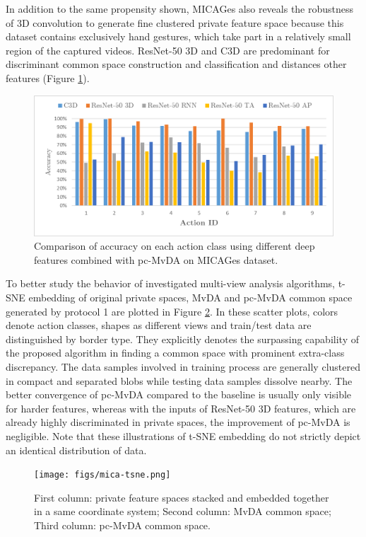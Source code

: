     In addition to the same propensity shown, MICAGes also reveals the robustness of 3D convolution to generate fine clustered private feature space because this dataset contains exclusively hand gestures, which take part in a relatively small region of the captured videos. ResNet-50 3D and C3D are predominant for discriminant common space construction and classification and distances other features (Figure \ref{fig:pc-MvDA_confusion_mica}).

    \begin{figure}[htbp]
        \centering
        \includegraphics[width=0.8\linewidth]{figs/pc-MvDA_confusion_mica.png}
        \caption{Comparison of accuracy on each action class using different deep features combined with pc-MvDA on MICAGes dataset.}
        \label{fig:pc-MvDA_confusion_mica}
    \end{figure}

    To better study the behavior of investigated multi-view analysis algorithms, t-SNE embedding of original private spaces, MvDA and pc-MvDA common space generated by protocol 1 are plotted in Figure \ref{fig:mica-tsne}. In these scatter plots, colors denote action classes, shapes as different views and train/test data are distinguished by border type. They explicitly denotes the surpassing capability of the proposed algorithm in finding a common space with prominent extra-class discrepancy. The data samples involved in training process are generally clustered in compact and separated blobs while testing data samples dissolve nearby. The better convergence of pc-MvDA compared to the baseline is usually only visible for harder features, whereas with the inputs of ResNet-50 3D features, which are already highly discriminated in private spaces, the improvement of pc-MvDA is negligible. Note that these illustrations of t-SNE embedding do not strictly depict an identical distribution of data.

    \begin{figure}[htbp]
        \centering
        \texttt{[image: figs/mica-tsne.png]}
        \caption{First column: private feature spaces stacked and embedded together in a same coordinate system; Second column: MvDA common space; Third column: pc-MvDA common space.}
        \label{fig:mica-tsne}
    \end{figure}
